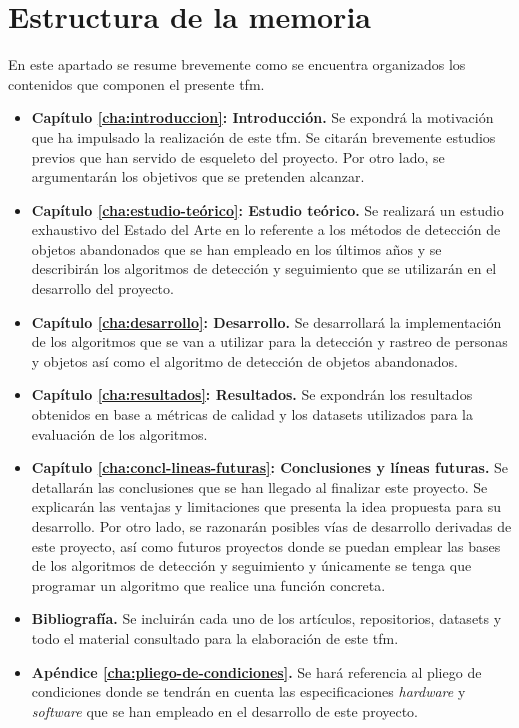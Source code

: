\section{Estructura de la memoria}
\label{sec:estructura-memoria}
En este apartado se resume brevemente como se encuentra organizados los contenidos que componen el presente \gls{tfm}.

\begin{itemize}
    \item \textbf{Capítulo \ref{cha:introduccion}: Introducción.} Se expondrá la motivación que ha impulsado la realización de este \gls{tfm}. Se citarán brevemente estudios previos que han servido de esqueleto del proyecto. Por otro lado, se argumentarán los objetivos que se pretenden alcanzar.
    \item \textbf{Capítulo \ref{cha:estudio-teórico}: Estudio teórico.} Se realizará un estudio exhaustivo del Estado del Arte en lo referente a los métodos de detección de objetos abandonados que se han empleado en los últimos años y se describirán los algoritmos de detección y seguimiento que se utilizarán en el desarrollo del proyecto.
    \item \textbf{Capítulo \ref{cha:desarrollo}: Desarrollo.} Se desarrollará la implementación de los algoritmos que se van a utilizar para la detección y rastreo de personas y objetos así como el algoritmo de detección de objetos abandonados.
    \item \textbf{Capítulo \ref{cha:resultados}: Resultados.} Se expondrán los resultados obtenidos en base a métricas de calidad y los datasets utilizados para la evaluación de los algoritmos.
    \item \textbf{Capítulo \ref{cha:concl-lineas-futuras}: Conclusiones y líneas futuras.} Se detallarán las conclusiones que se han llegado al finalizar este proyecto. Se explicarán las ventajas y limitaciones que presenta la idea propuesta para su desarrollo. Por otro lado, se razonarán posibles vías de desarrollo derivadas de este proyecto, así como futuros proyectos donde se puedan emplear las bases de los algoritmos de detección y seguimiento y únicamente se tenga que programar un algoritmo que realice una función concreta.
    \item \textbf{Bibliografía.} Se incluirán cada uno de los artículos, repositorios, datasets y todo el material consultado para la elaboración de este \gls{tfm}. 
    \item \textbf{Apéndice \ref{cha:pliego-de-condiciones}.} Se hará referencia al pliego de condiciones donde se tendrán en cuenta las especificaciones \textit{hardware} y \textit{software} que se han empleado en el desarrollo de este proyecto.

\end{itemize}
